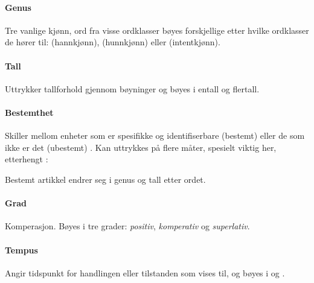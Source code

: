 \paragraph{Genus} Tre vanlige kjønn, ord fra visse ordklasser bøyes forskjellige etter hvilke ordklasser de hører til:  (hannkjønn),  (hunnkjønn) eller  (intentkjønn).

\paragraph{Tall} Uttrykker tallforhold gjennom bøyninger og bøyes i entall og flertall.

\newline
{}\newline

\paragraph{Bestemthet} Skiller mellom enheter som er spesifikke og identifiserbare (bestemt) eller de som ikke er det (ubestemt) \cite{wiki-bestemthet}. Kan uttrykkes på flere måter, spesielt viktig her, etterhengt :

\newline
{}\newline

Bestemt artikkel endrer seg i genus og tall etter ordet.

\newline
{}\newline

\paragraph{Grad} Komperasjon. Bøyes i tre grader: \textit{positiv}, \textit{komperativ} og \textit{superlativ}.

\newline
{}\newline
{}

\paragraph{Tempus} Angir tidspunkt for handlingen eller tilstanden som vises til, og bøyes i  og .

